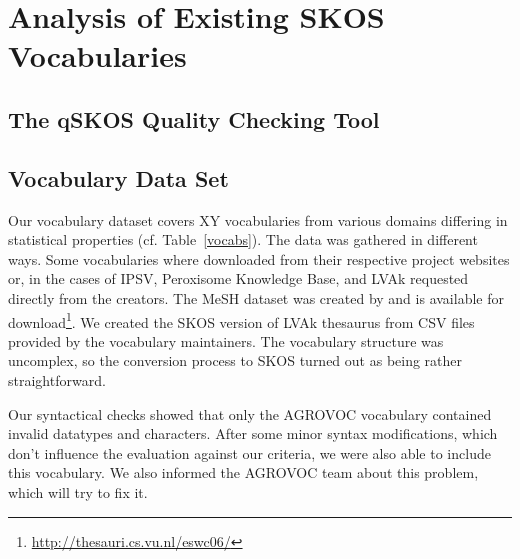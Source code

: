 
\section{Analysis of Existing SKOS Vocabularies}\label{sec:analysis}

\subsection{The qSKOS Quality Checking Tool}


\subsection{Vocabulary Data Set}

Our vocabulary dataset covers XY vocabularies from various domains differing in statistical properties (cf. Table~\ref{vocabs}). The data was gathered in different ways. Some vocabularies where downloaded from their respective project websites or, in the cases of IPSV, Peroxisome Knowledge Base, and LVAk requested directly from the creators. The MeSH dataset was created by \cite{Assem2006} and is available for download\footnote{\url{http://thesauri.cs.vu.nl/eswc06/}}. We created the SKOS version of LVAk thesaurus from CSV files provided by the vocabulary maintainers. The vocabulary structure was uncomplex, so the conversion process to SKOS turned out as being rather straightforward.
 
Our syntactical checks showed that only the AGROVOC vocabulary contained invalid datatypes and characters. After some minor syntax modifications, which don’t influence the evaluation against our criteria, we were also able to include this vocabulary. We also informed the AGROVOC team about this problem, which will try to fix it.



